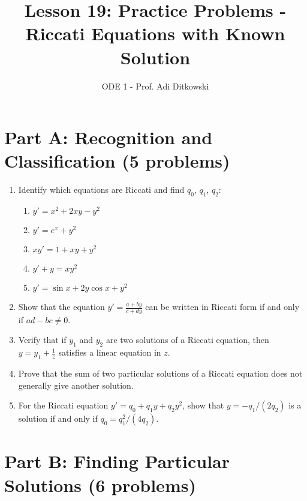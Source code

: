 \documentclass[12pt]{article}
\title{Lesson 19: Practice Problems - Riccati Equations with Known Solution}
\author{ODE 1 - Prof. Adi Ditkowski}
\date{}
\begin{document}
\maketitle

\section*{Part A: Recognition and Classification (5 problems)}

\begin{enumerate}
    \item Identify which equations are Riccati and find $q_0$, $q_1$, $q_2$:
    \begin{enumerate}[label=(\alph*)]
        \item $y' = x^2 + 2xy - y^2$
        \item $y' = e^x + y^2$
        \item $xy' = 1 + xy + y^2$
        \item $y' + y = xy^2$
        \item $y' = \sin x + 2y\cos x + y^2$
    \end{enumerate}

    \item Show that the equation $y' = \frac{a + by}{c + dy}$ can be written in Riccati form if and only if $ad - bc \neq 0$.

    \item Verify that if $y_1$ and $y_2$ are two solutions of a Riccati equation, then $y = y_1 + \frac{1}{z}$ satisfies a linear equation in $z$.

    \item Prove that the sum of two particular solutions of a Riccati equation does not generally give another solution.

    \item For the Riccati equation $y' = q_0 + q_1y + q_2y^2$, show that $y = -q_1/(2q_2)$ is a solution if and only if $q_0 = q_1^2/(4q_2)$.
\end{enumerate}

\section*{Part B: Finding Particular Solutions (6 problems)}
\end{document}
